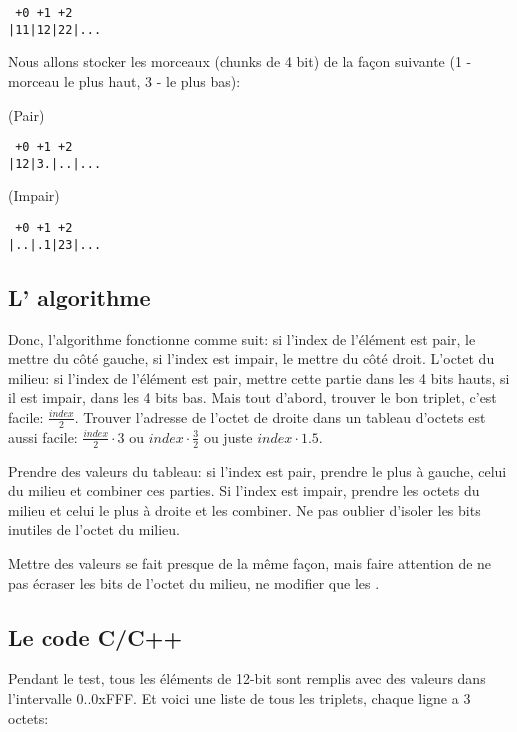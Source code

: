 \begin{lstlisting}
 +0 +1 +2
|11|12|22|...
\end{lstlisting}

Nous allons stocker les morceaux (chunks de 4 bit) de la façon suivante (1 - morceau
le plus haut, 3 - le plus bas):

(Pair)

\begin{lstlisting}
 +0 +1 +2
|12|3.|..|...
\end{lstlisting}

(Impair)

\begin{lstlisting}
 +0 +1 +2
|..|.1|23|...
\end{lstlisting}

\subsection{L' algorithme}

Donc, l'algorithme fonctionne comme suit: si l'index de l'élément est pair, le mettre
du côté gauche, si l'index est impair, le mettre du côté droit.
L'octet du milieu: si l'index de l'élément est pair, mettre cette partie dans les
4 bits hauts, si il est impair, dans les 4 bits bas.
Mais tout d'abord, trouver le bon triplet, c'est facile: $\frac{index}{2}$.
Trouver l'adresse de l'octet de droite dans un tableau d'octets est aussi facile: $\frac{index}{2} \cdot 3$
ou $index \cdot \frac{3}{2}$ ou juste $index \cdot 1.5$.

Prendre des valeurs du tableau: si l'index est pair, prendre le plus à gauche, celui
du milieu et combiner ces parties.
Si l'index est impair, prendre les octets du milieu et celui le plus à droite et
les combiner.
Ne pas oublier d'isoler les bits inutiles de l'octet du milieu.

Mettre des valeurs se fait presque de la même façon, mais faire attention de ne pas
écraser les  bits de l'octet du milieu, ne modifier que les .

\subsection{Le code C/C++}



Pendant le test, tous les éléments de 12-bit sont remplis avec des valeurs dans l'intervalle
0..0xFFF.
Et voici une liste de tous les triplets, chaque ligne a 3 octets:

